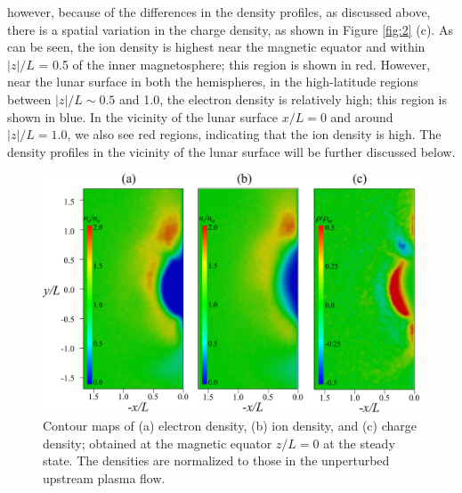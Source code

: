 \documentclass[draft,jgrga]{agutex2015}
\begin{document}
\begin{article}
however, because of the differences in the density profiles, as discussed above, 
there is a spatial variation in the charge density, as shown in Figure \ref{fig:2} (c). 
As can be seen, the ion density is highest near the magnetic equator and
within $|z|/L$ = 0.5 of the inner magnetosphere; this region is shown in red. 
However, near the lunar surface in both the hemispheres, in the high-latitude regions between $|z|/L \sim 0.5$ and 1.0, 
the electron density is relatively high; this region is shown in blue.
In the vicinity of the lunar surface $x/L=0$ and around $|z|/L=1.0$, 
we also see red regions, indicating that the ion density is high.
The density profiles in the vicinity of the lunar surface will be further discussed below.


\begin{figure}[t]
\centering
\noindent\includegraphics[width=15cm]{./figures/Fig_3_bb-crop.pdf}
\caption{
Contour maps of (a) electron density, (b) ion density, and (c) charge density; 
obtained at the magnetic equator $z/L=0$ at the steady state.
The densities are normalized to those in the unperturbed upstream plasma flow.
}
\label{fig:3}
\end{figure}


\end{article}
\end{document}
